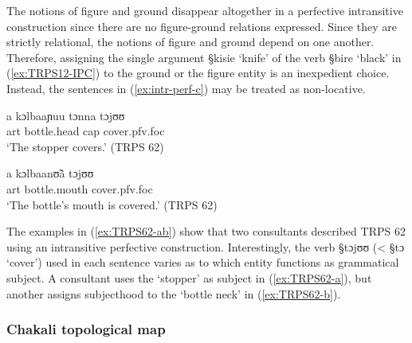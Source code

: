The notions of
figure and ground disappear altogether in a perfective intransitive
construction since there are no
 figure-ground relations expressed. Since  they are strictly relational, the
notions of figure
and ground 
depend
on one another. Therefore,  assigning   the single
argument {\S kisie} `knife' of the verb {\S bire} `black'   in
(\ref{ex:TRPS12-IPC}) to the ground or the figure entity is  an
inexpedient choice. Instead, the sentences in (\ref{ex:intr-perf-c}) may be 
treated as non-locative.


\begin{exe}
\ex\label{ex:TRPS62-ab}

\begin{xlist}
\ex\label{ex:TRPS62-a}
\gll a kɔlbaaɲuu tɔnna tɔjʊʊ\\
{\sc art} bottle.head cap cover.{\sc pfv.foc} \\
\glt `The stopper covers.' (TRPS 62)

\ex\label{ex:TRPS62-b}
\gll a kɔlbaanʊ̃ã tɔjʊʊ\\
{\sc art} bottle.mouth cover.{\sc pfv.foc}\\
\glt `The bottle's mouth is covered.' (TRPS 62)

\end{xlist}
\end{exe}


The examples in (\ref{ex:TRPS62-ab}) show that two consultants described TRPS 62
using an intransitive
perfective construction. Interestingly, the  verb {\S  tɔjʊʊ} (< 
{\S tɔ}  `cover')  
used  in each sentence varies as to which entity 
functions as grammatical subject. A consultant uses the `stopper' as subject in
(\ref{ex:TRPS62-a}), but another  assigns subjecthood to the `bottle neck' in 
(\ref{ex:TRPS62-b}). 










\subsubsection{Chakali topological map}
\label{sec:SPA-top-map}


